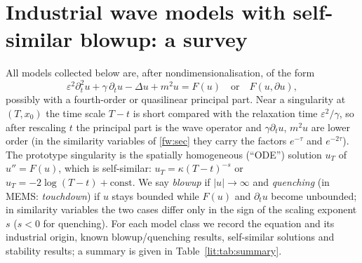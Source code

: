 \section{Industrial wave models with self-similar blowup: a survey}
\label{lit:sec}

All models collected below are, after nondimensionalisation, of the form
\begin{equation}\label{lit:eq:generic}
  \varepsilon^{2}\partial_t^2 u+\gamma\,\partial_t u-\Delta u+m^{2}u
  =F(u)\quad\text{or}\quad F(u,\partial u),
\end{equation}
possibly with a fourth-order or quasilinear principal part. Near a
singularity at $(T,x_0)$ the time scale $T-t$ is short compared with the
relaxation time $\varepsilon^{2}/\gamma$, so after rescaling $t$ the
principal part is the wave operator and $\gamma\partial_t u$, $m^2u$ are
lower order (in the similarity variables of \cref{fw:sec} they carry
the factors $e^{-\tau}$ and $e^{-2\tau}$). The prototype singularity is the
spatially homogeneous (``ODE'') solution $u_T$ of $u''=F(u)$, which is
self-similar: $u_T=\kappa(T-t)^{-s}$ or $u_T=-2\log(T-t)+\mathrm{const}$.
We say \emph{blowup} if $|u|\to\infty$ and \emph{quenching} (in MEMS:
\emph{touchdown}) if $u$ stays bounded while $F(u)$ and $\partial_tu$ become
unbounded; in similarity variables the two cases differ only in the sign of
the scaling exponent $s$ ($s<0$ for quenching). For each model class we
record the equation and its industrial origin, known blowup/quenching
results, self-similar solutions and stability results; a summary is given
in Table~\ref{lit:tab:summary}.

